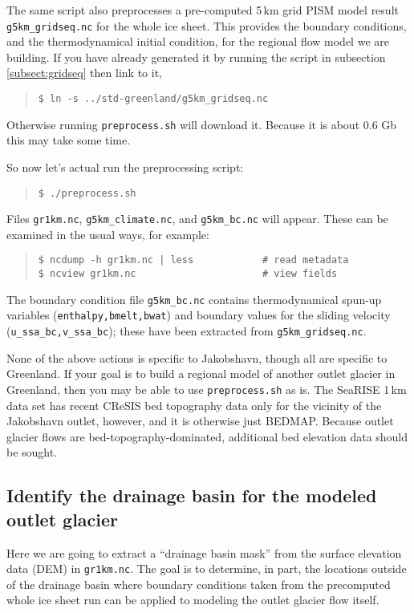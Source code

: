 The same script also preprocesses a pre-computed 5\,km grid PISM model result \texttt{g5km_gridseq.nc} for the whole ice sheet.  This provides the boundary conditions, and the thermodynamical initial condition, for the regional flow model we are building.  If you have already generated it by running the script in subsection \ref{subsect:gridseq} then link to it,
\begin{quote}\small
\begin{verbatim}
$ ln -s ../std-greenland/g5km_gridseq.nc
\end{verbatim}
\normalsize\end{quote}
Otherwise running \texttt{preprocess.sh} will download it.  Because it is about 0.6 Gb this may take some time.

So now let's actual run the preprocessing script:
\begin{quote}\small
\begin{verbatim}
$ ./preprocess.sh
\end{verbatim}
\normalsize\end{quote}
Files \texttt{gr1km.nc}, \texttt{g5km_climate.nc}, and \texttt{g5km_bc.nc} will appear.  These can be examined in the usual ways, for example:
\begin{quote}\small
\begin{verbatim}
$ ncdump -h gr1km.nc | less            # read metadata
$ ncview gr1km.nc                      # view fields
\end{verbatim}
\normalsize\end{quote}
The boundary condition file \texttt{g5km_bc.nc} contains thermodynamical spun-up variables (\texttt{enthalpy,bmelt,bwat}) and boundary values for the sliding velocity (\texttt{u_ssa_bc,v_ssa_bc}); these have been extracted from \texttt{g5km_gridseq.nc}.

None of the above actions is specific to Jakobshavn, though all are specific to Greenland.  If your goal is to build a regional model of another outlet glacier in Greenland, then you may be able to use \texttt{preprocess.sh} as is.  The SeaRISE 1\,km data set has recent CReSIS bed topography data only for the vicinity of the Jakobshavn outlet, however, and it is otherwise just BEDMAP.  Because outlet glacier flows are bed-topography-dominated, additional bed elevation data should be sought.

\subsection*{Identify the drainage basin for the modeled outlet glacier}
Here we are going to extract a ``drainage basin mask'' from the surface elevation data (DEM) in \texttt{gr1km.nc}.  The goal is to determine, in part, the locations outside of the drainage basin where boundary conditions taken from the precomputed whole ice sheet run can be applied to modeling the outlet glacier flow itself.

